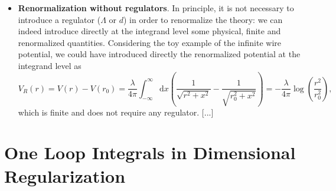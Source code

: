 \begin{itemize}
              [...]

          We can also apply it to our toy-example of the infinite wire potential, by performing the integral in \(d\) dimensions instead of 4 dimensions:
          \[
              V(r) = \dots \begin{dcases}
                  x \to \mathbf{x} = \begin{pmatrix}
                                         x_1 & x_2 & \cdots & x_{d}
                                     \end{pmatrix}                                           \\
                  \mathrm{d} x \to \mathrm{d}^d x = \mathrm{d} x_1 \mathrm{d} x_2 \cdots \mathrm{d} x_{d} \\
                  x^2 \to \vert \mathbf{x}^2 \vert = \sum_{j=1}^d x_j^2
              \end{dcases}
          \]
          such that we can rewrite the potential as
          \[
              V(r) = \dots
          \]
          where \(\mu\) is a scale with mass dimension \(1 = [\mu]\).
              [...]
              [...]
          The integral is now convergent for \(0<d<1\), where it is analytic in \(d\). We can thus analytically continue the result in the whole complex plane with the exception for some points in which it will have poles. We can show that ...
          \[
              \dots
          \]
          and we get the usual result for \(V_R\) as \(d \to 1\).

    \item \textbf{Renormalization without regulators}. In principle, it is not necessary to introduce a regulator (\(\Lambda\) or \(d\)) in order to renormalize the theory: we can indeed introduce directly at the integrand level some physical, finite and renormalized quantities. Considering the toy example of the infinite wire potential, we could have introduced directly the renormalized potential at the integrand level as
          \[
              V_R(r) = V(r) - V(r_0) = \frac{\lambda}{4 \pi} \int_{-\infty}^{\infty} \mathrm{d} x \left( \frac{1}{\sqrt{r^2 + x^2} } - \frac{1}{\sqrt{r_0^2 + x^{2}}}\right) = -\frac{\lambda}{4 \pi} \log\left( \frac{r^2}{r_0^2} \right),
          \]
          which is finite and does not require any regulator.
              [...]
\end{itemize}




\section{One Loop Integrals in Dimensional Regularization}


